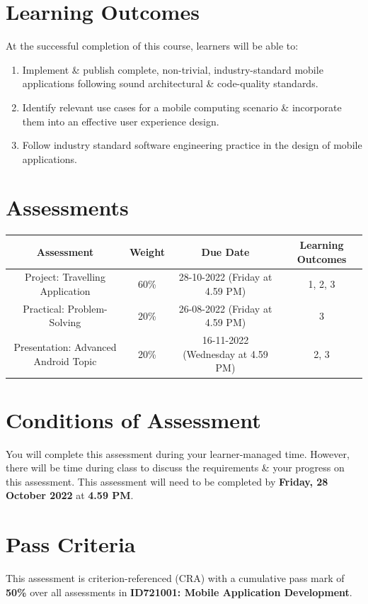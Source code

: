 \documentclass{article}
\begin{document}
\section*{Learning Outcomes}
At the successful completion of this course, learners will be able to:
\begin{enumerate}
	\item Implement \& publish complete, non-trivial, industry-standard mobile applications following sound architectural \& code-quality standards.
	\item Identify relevant use cases for a mobile computing scenario \& incorporate them into an effective user experience design.
	\item Follow industry standard software engineering practice in the design of mobile applications.
\end{enumerate}

\section*{Assessments}
\renewcommand{\arraystretch}{1.5}
\begin{tabular}{|c|c|c|c|}
	\hline
	\textbf{Assessment} & \textbf{Weight} & \textbf{Due Date}    & \textbf{Learning Outcomes} \\ \hline
	Project: Travelling Application             & 60\%            & 28-10-2022 (Friday at 4.59 PM)  & 1, 2, 3                    \\ \hline
	Practical: Problem-Solving          & 20\%            & 26-08-2022 (Friday at 4.59 PM) & 3                    \\ \hline
	Presentation: Advanced Android Topic        & 20\%            & 16-11-2022 (Wednesday at 4.59 PM) & 2, 3                       \\ \hline
\end{tabular}

\section*{Conditions of Assessment}
You will complete this assessment during your learner-managed time. However, there will be time during class to discuss the requirements \& your progress on this assessment. This assessment will need to be completed by \textbf{Friday, 28 October 2022} at \textbf{4.59 PM}.

\section*{Pass Criteria}
This assessment is criterion-referenced (CRA) with a cumulative pass mark of \textbf{50\%} over all assessments in \textbf{ID721001: Mobile Application Development}.
\end{document}
